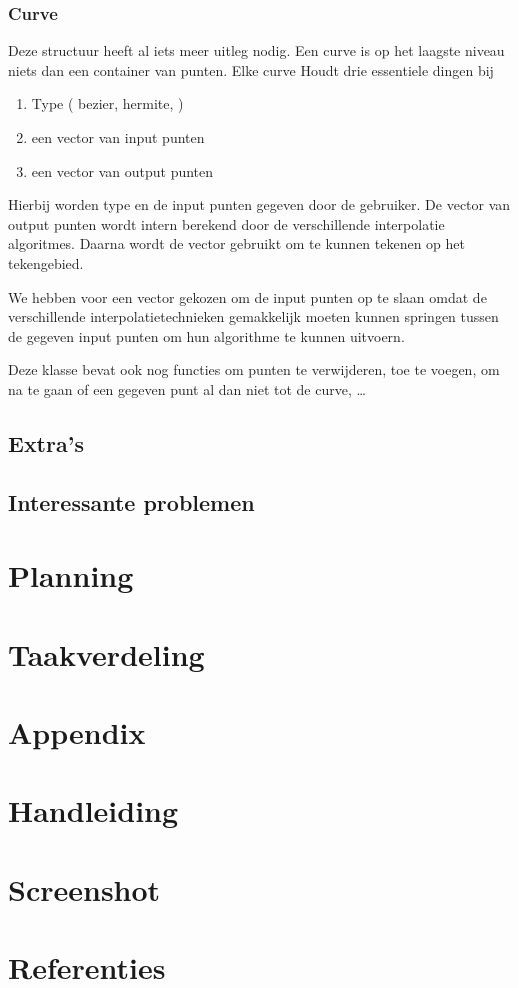 \documentclass[a4paper,11pt,oneside, titlepage]{article}
\begin{document}
\subsubsection{Curve}
Deze structuur heeft al iets meer uitleg nodig. Een curve is op het laagste niveau niets dan
een container van punten.\newline
Elke curve Houdt drie essentiele dingen bij
\begin{enumerate}
\item Type ( bezier, hermite, \ldot )
\item een vector van input punten
\item een vector van output punten
\end{enumerate}

Hierbij worden type en de input punten gegeven door de gebruiker. De vector van output punten
wordt intern berekend door de verschillende interpolatie algoritmes. Daarna wordt de vector
gebruikt om te kunnen tekenen op het tekengebied.\newline

We hebben voor een vector gekozen om de input punten op te slaan omdat de verschillende
interpolatietechnieken gemakkelijk moeten kunnen springen tussen de gegeven input punten om
hun algorithme te kunnen uitvoern.

Deze klasse bevat ook nog functies om punten te verwijderen, toe te voegen, om na te gaan of een gegeven punt al dan niet tot de curve, \ldots
\subsection{Extra's}
\subsection{Interessante problemen}
\newpage
\section{Planning}
\newpage
\section{Taakverdeling}
\newpage
\section{Appendix}
\appendix
\section{Handleiding}
\section{Screenshot}
\section{Referenties}
\end{document}
